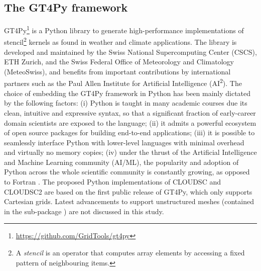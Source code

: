 \documentclass[gmd,manuscript,online]{copernicus}
\theoremstyle{theorem}
\theoremstyle{definition}
\theoremstyle{remark}
\theoremstyle{proposition}
\begin{document}
	\subsection{The GT4Py framework}
	\label{section:gt4py}

	GT4Py\footnote{\url{https://github.com/GridTools/gt4py}} is a Python library to generate high-performance implementations of stencil\footnote{A \emph{stencil} is an operator that computes array elements by accessing a fixed pattern of neighbouring items.} kernels as found in weather and climate applications. The library is developed and maintained by the Swiss National Supercomputing Center (CSCS), ETH Zurich, and the Swiss Federal Office of Meteorology and Climatology (MeteoSwiss), and benefits from important contributions by international partners such as the Paul Allen Institute for Artificial Intelligence (AI\textsuperscript{2}). The choice of embedding the GT4Py framework in Python has been mainly dictated by the following factors: (i) Python is taught in many academic courses due its clean, intuitive and expressive syntax, so that a significant fraction of early-career domain scientists are exposed to the language; (ii) it admits a powerful ecosystem of open source packages for building end-to-end applications; (iii) it is possible to seamlessly interface Python with lower-level languages with minimal overhead and virtually no memory copies; (iv) under the thrust of the Artificial Intelligence and Machine Learning community (AI/ML), the popularity and adoption of Python across the whole scientific community is constantly growing, as opposed to Fortran \citep{shipman23}. The proposed Python implementations of CLOUDSC and CLOUDSC2 are based on the first public release of GT4Py, which only supports Cartesian grids. Latest advancements to support unstructured meshes (contained in the sub-package ) are not discussed in this study.
\end{document}
